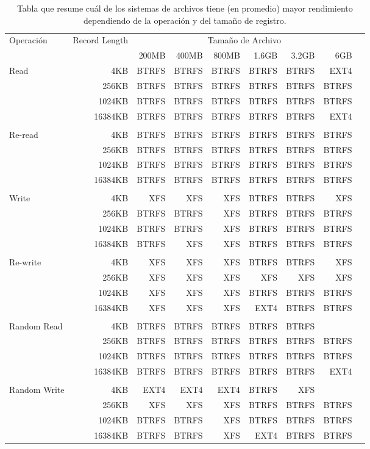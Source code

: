 \begin{table}[H]\centering

\scriptsize
\begin{tabular}{lrrrrrrrr}\toprule
Operación &Record Length &\multicolumn{6}{c}{Tamaño de Archivo} \\\cmidrule{1-8}
& &200MB &400MB &800MB &1.6GB &3.2GB &6GB \\\midrule
\multirow{4}{*}{Read} &4KB &BTRFS &BTRFS &BTRFS &BTRFS &BTRFS &EXT4 \\
&256KB &BTRFS &BTRFS &BTRFS &BTRFS &BTRFS &BTRFS \\
&1024KB &BTRFS &BTRFS &BTRFS &BTRFS &BTRFS &BTRFS \\
&16384KB &BTRFS &BTRFS &BTRFS &BTRFS &BTRFS &EXT4 \\
& & & & & & & \\
\multirow{4}{*}{Re-read} &4KB &BTRFS &BTRFS &BTRFS &BTRFS &BTRFS &BTRFS \\
&256KB &BTRFS &BTRFS &BTRFS &BTRFS &BTRFS &BTRFS \\
&1024KB &BTRFS &BTRFS &BTRFS &BTRFS &BTRFS &BTRFS \\
&16384KB &BTRFS &BTRFS &BTRFS &BTRFS &BTRFS &BTRFS \\
& & & & & & & \\
\multirow{4}{*}{Write} &4KB &XFS &XFS &XFS &BTRFS &BTRFS &XFS \\
&256KB &BTRFS &BTRFS &XFS &BTRFS &BTRFS &BTRFS \\
&1024KB &BTRFS &BTRFS &XFS &BTRFS &BTRFS &BTRFS \\
&16384KB &BTRFS &XFS &XFS &BTRFS &BTRFS &BTRFS \\
& & & & & & & \\
\multirow{4}{*}{Re-write} &4KB &XFS &XFS &XFS &BTRFS &BTRFS &XFS \\
&256KB &XFS &XFS &XFS &XFS &XFS &XFS \\
&1024KB &XFS &XFS &XFS &BTRFS &BTRFS &BTRFS \\
&16384KB &XFS &XFS &XFS &EXT4 &BTRFS &BTRFS \\
& & & & & & & \\
\multirow{4}{*}{Random Read} &4KB &BTRFS &BTRFS &BTRFS &BTRFS &BTRFS & \\
&256KB &BTRFS &BTRFS &BTRFS &BTRFS &BTRFS &BTRFS \\
&1024KB &BTRFS &BTRFS &BTRFS &BTRFS &BTRFS &BTRFS \\
&16384KB &BTRFS &BTRFS &BTRFS &BTRFS &BTRFS &EXT4 \\
& & & & & & & \\
\multirow{4}{*}{Random Write} &4KB &EXT4 &EXT4 &EXT4 &BTRFS &XFS & \\
&256KB &XFS &XFS &XFS &BTRFS &BTRFS &BTRFS \\
&1024KB &BTRFS &BTRFS &XFS &BTRFS &BTRFS &BTRFS \\
&16384KB &BTRFS &BTRFS &XFS &EXT4 &BTRFS &BTRFS \\
\bottomrule
\end{tabular}
\caption{Tabla que resume cuál de los sistemas de archivos tiene (en promedio) mayor rendimiento dependiendo de la operación y del tamaño de registro.}\label{tab: }
\end{table}

